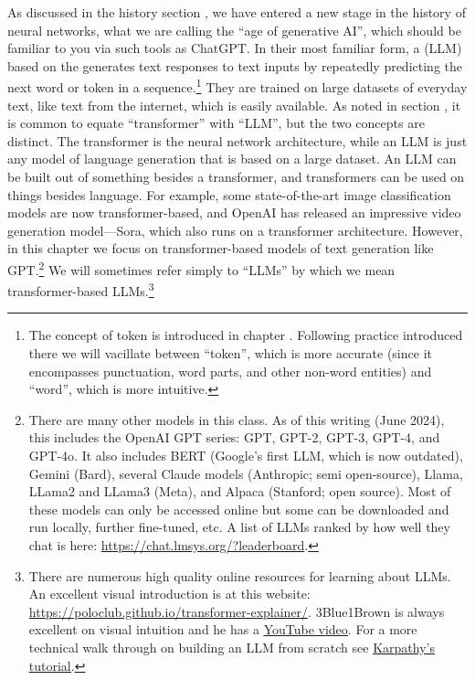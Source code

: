 As discussed in the history section , we have entered
a new stage in the history of neural networks, what we are calling the ``age of
generative AI'', which should be familiar to you via such tools as ChatGPT. In
their most familiar form, a  (LLM) based on the
 generates text responses to text inputs by
repeatedly predicting the next word or token in a sequence.\footnote{The
concept of token is introduced in chapter .
Following practice introduced there we will vacillate between ``token'', which
is more accurate (since it encompasses punctuation, word parts, and other
non-word entities) and ``word'', which is more intuitive.} They are trained on
large datasets of everyday text, like text from the internet, which is easily
available. As noted in section , it is common to
equate ``transformer'' with ``LLM'', but the two concepts are distinct. The
transformer is the neural network architecture, while an LLM is just any model
of language generation that is based on a large dataset. An LLM can be built
out of something besides a transformer, and transformers can be used on things
besides language. For example, some state-of-the-art image classification
models are now transformer-based, and OpenAI has released an impressive video
generation model---Sora, which also runs on a transformer architecture.
However, in this chapter we focus on transformer-based models of text
generation like GPT.\footnote{There are many other models in this class. As of
this writing (June 2024), this includes the OpenAI GPT series: GPT, GPT-2,
GPT-3, GPT-4, and GPT-4o. It also includes BERT (Google's first LLM, which is
now outdated), Gemini (Bard), several Claude models (Anthropic;  semi
open-source), Llama, LLama2 and LLama3 (Meta), and Alpaca (Stanford; open
source). Most of these models can only be accessed online but some can be
downloaded and run locally, further fine-tuned, etc. A list of LLMs ranked by
how well they chat is here: \url{https://chat.lmsys.org/?leaderboard}.} We will
sometimes refer simply to ``LLMs'' by which we mean transformer-based
LLMs.\footnote{There are numerous high quality online resources for learning
about LLMs. An excellent visual introduction is at this website:
\url{https://poloclub.github.io/transformer-explainer/}. 3Blue1Brown is always
excellent on visual intuition and he has a
\href{https://www.youtube.com/watch?v=wjZofJX0v4M&list=PLZHQObOWTQDNU6R1_67000Dx_ZCJB-3pi}{\underline{YouTube
video}}. For a more technical walk through on building an LLM from scratch see
\href{https://www.youtube.com/watch?v=kCc8FmEb1nY}{\underline{Karpathy's
tutorial}}.}

